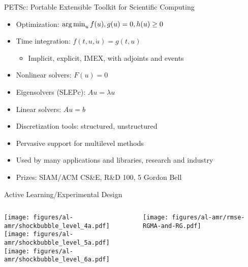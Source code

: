 \documentclass[aspectratio=169]{beamer}
\begin{document}
\begin{frame}{PETSc: Portable Extensible Toolkit for Scientific Computing}
  \begin{itemize}
  \item Optimization: $\operatorname{arg\,min}_u f(u), g(u) = 0, h(u) \ge 0$
  \item Time integration: $f(t, u, \dot u) = g(t, u)$
    \begin{itemize}
    \item Implicit, explicit, IMEX, with adjoints and events
    \end{itemize}
  \item Nonlinear solvers: $F(u) = 0$
  \item Eigensolvers (SLEPc): $A u = \lambda u$
  \item Linear solvers: $A u = b$
  \item Discretization tools: structured, unstructured
  \item Pervasive support for multilevel methods
  \item Used by many applications and libraries, research and industry
  \item Prizes: SIAM/ACM CS\&E, R\&D 100, 5 Gordon Bell
  \end{itemize}
\end{frame}





\begin{frame}{Active Learning/Experimental Design}
  \begin{columns}
    \begin{column}{0.4\textwidth}
      \texttt{[image: figures/al-amr/shockbubble\_level\_4a.pdf]} \\
      \texttt{[image: figures/al-amr/shockbubble\_level\_5a.pdf]} \\
      \texttt{[image: figures/al-amr/shockbubble\_level\_6a.pdf]}
    \end{column}
    \begin{column}{0.6\textwidth}
      \texttt{[image: figures/al-amr/rmse-RGMA-and-RG.pdf]}
    \end{column}
  \end{columns}
\end{frame}
\end{document}
